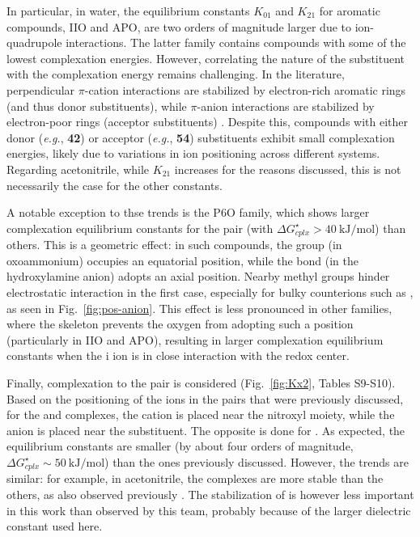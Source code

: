 \documentclass[review,preprint]{elsarticle}
\begin{document}
In particular, in water, the equilibrium constants $K_{01}$ and $K_{21}$ for aromatic compounds, IIO and APO, are two orders of magnitude larger due to ion-quadrupole interactions. The latter family contains compounds with some of the lowest complexation energies. However, correlating the nature of the substituent with the complexation energy remains challenging. In the literature, perpendicular $\pi$-cation interactions are stabilized by electron-rich aromatic rings (and thus donor substituents), while $\pi$-anion interactions are stabilized by electron-poor rings (acceptor substituents) \cite{pappFourFacesInteraction2017}. Despite this, compounds with either donor (\textit{e.g.}, \textbf{42}) or acceptor (\textit{e.g.}, \textbf{54}) substituents exhibit small complexation energies, likely due to variations in ion positioning across different systems. Regarding acetonitrile, while $K_{21}$ increases for the reasons discussed, this is not necessarily the case for the other constants. 

A notable exception to thse trends is the P6O family, which shows larger complexation equilibrium constants for the  pair (with $\Delta G^\star_{cplx} > \SI{40}{\kilo\joule\per\mole}$) than others. This is a geometric effect: in such compounds, the  group (in oxoammonium) occupies an equatorial position, while the  bond (in the hydroxylamine anion) adopts an axial position. Nearby methyl groups hinder electrostatic interaction in the first case, especially for bulky counterions such as , as seen in Fig.~\ref{fig:pos-anion}. This effect is less pronounced in other families, where the skeleton prevents the oxygen from adopting such a position (particularly in IIO and APO), resulting in larger complexation equilibrium constants when the i ion is in close interaction with the redox center.

Finally, complexation to the  pair is considered (Fig.~\ref{fig:Kx2}, Tables S9-S10). Based on the positioning of the ions in the pairs that were previously discussed, for the  and  complexes, the cation is placed near the nitroxyl moiety, while the anion is placed near the substituent. The opposite is done for . As expected, the equilibrium constants are smaller (by about four orders of magnitude, $\Delta G^\star_{cplx} \sim \SI{50}{\kilo\joule\per\mole}$) than the ones previously discussed. However, the trends are similar: for example, in acetonitrile, the  complexes are more stable than the others, as also observed previously \cite{wylieImprovedPerformanceAllOrganic2019a}. The stabilization of  is however less important in this work than observed by this team, probably because of the larger dielectric constant used here.
\end{document}
